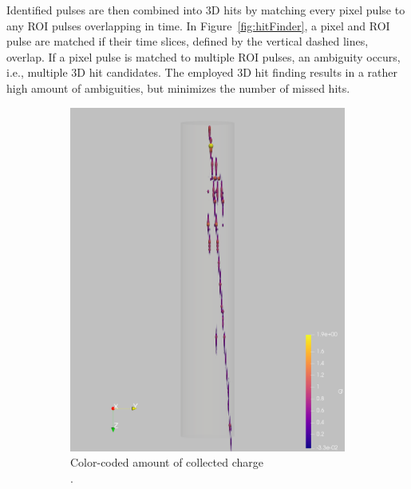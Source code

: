 \documentclass[instruments,article,accept,moreauthors,pdftex]{Definitions/mdpi}
\begin{document}
Identified pulses are then combined into 3D hits by matching every pixel pulse to any ROI pulses overlapping in time.
In Figure~\ref{fig:hitFinder}, a pixel and ROI pulse are matched if their time slices, defined by the vertical dashed lines, overlap.
If a pixel pulse is matched to multiple ROI pulses, an ambiguity occurs, i.e., multiple 3D hit candidates.
The employed 3D hit finding results in a rather high amount of ambiguities, but minimizes the number of missed hits.

\begin{figure}[H]
	\centering
	\begin{subfigure}{\textwidth}
		\centering
		\includegraphics[viewport=600 0 1000 2000, clip, height=\textwidth, angle=90]{event967_pulses_q}
		\caption{Color-coded amount of collected charge\\.}
		\label{fig:pca_a}
	\end{subfigure}
	\begin{subfigure}{\textwidth}
		\centering

\end{subfigure}
\end{figure}
\end{document}
